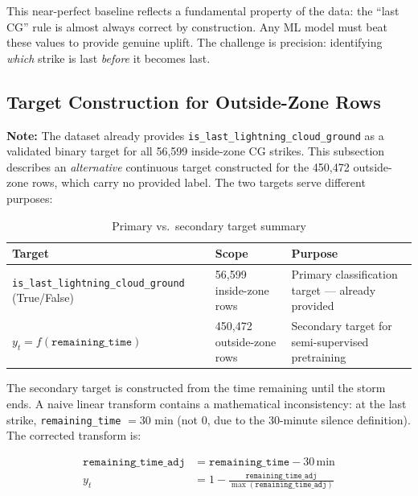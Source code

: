 \documentclass[12pt,a4paper]{article}
\begin{document}
\noindent This near-perfect baseline reflects a fundamental property of the data: the
``last CG'' rule is almost always correct by construction. Any ML model must beat
these values to provide genuine uplift. The challenge is precision: identifying
\emph{which} strike is last \emph{before} it becomes last.

\subsection{Target Construction for Outside-Zone Rows}
\label{sec:target_construction}

\noindent\textbf{Note:} The dataset already provides \texttt{is\_last\_lightning\_cloud\_ground}
as a validated binary target for all 56,599 inside-zone CG strikes.
This subsection describes an \emph{alternative} continuous target constructed for the
450,472 outside-zone rows, which carry no provided label.
The two targets serve different purposes:

\begin{table}[H]
\centering
\caption{Primary vs.\ secondary target summary}
\begin{tabular}{lll}
\toprule
\textbf{Target} & \textbf{Scope} & \textbf{Purpose} \\
\midrule
\texttt{is\_last\_lightning\_cloud\_ground} (True/False)
  & 56,599 inside-zone rows & Primary classification target — already provided \\
$y_t = f(\texttt{remaining\_time})$
  & 450,472 outside-zone rows & Secondary target for semi-supervised pretraining \\
\bottomrule
\end{tabular}
\end{table}

\noindent The secondary target is constructed from the time remaining until the storm ends.
A naive linear transform contains a mathematical inconsistency: at the last strike,
\texttt{remaining\_time} $= 30$ min (not 0, due to the 30-minute silence definition).
The corrected transform is:

\begin{align}
  \texttt{remaining\_time\_adj} &= \texttt{remaining\_time} - 30\,\text{min} \\
  y_t &= 1 - \frac{\texttt{remaining\_time\_adj}}{\max(\texttt{remaining\_time\_adj})}
\end{align}
\end{document}
